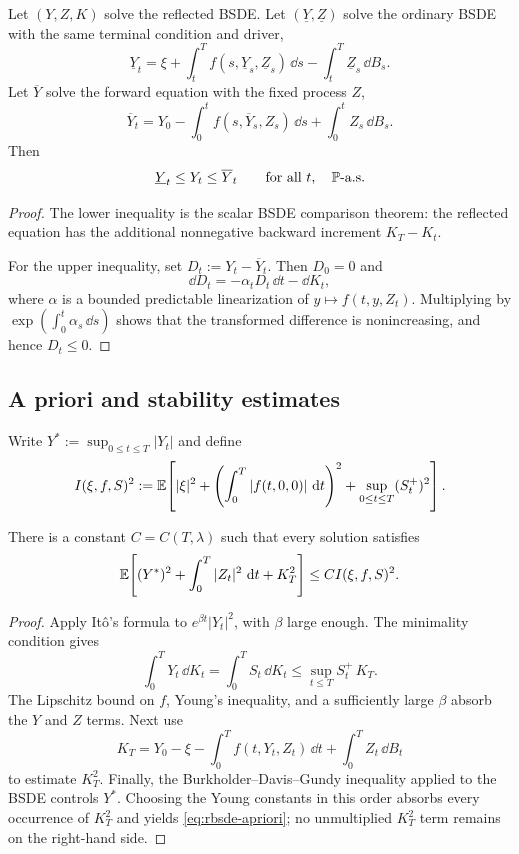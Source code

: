 \begin{proposition}
Let $(Y,Z,K)$ solve the reflected BSDE\@. Let $(\underline Y,\underline Z)$
solve the ordinary BSDE with the same terminal condition and driver,
\[
  \underline Y_t
  =\xi+\int_t^T f(s,\underline Y_s,\underline Z_s)\,\dd s
       -\int_t^T\underline Z_s\,\dd B_s.
\]
Let $\overline Y$ solve the forward equation with the fixed process $Z$,
\[
  \overline Y_t
  =Y_0-\int_0^t f(s,\overline Y_s,Z_s)\,\dd s
       +\int_0^t Z_s\,\dd B_s.
\]
Then
\[
  \underline Y_t\leq Y_t\leq\overline Y_t
  \qquad\text{for all }t,
  \quad\P\text{-a.s.}
\]
\end{proposition}

\begin{proof}
The lower inequality is the scalar BSDE comparison theorem: the reflected
equation has the additional nonnegative backward increment $K_T-K_t$.

For the upper inequality, set $D_t:=Y_t-\overline Y_t$. Then $D_0=0$ and
\[
  \dd D_t=-\alpha_tD_t\,\dd t-\dd K_t,
\]
where $\alpha$ is a bounded predictable linearization of
$y\mapsto f(t,y,Z_t)$. Multiplying by
$\exp(\int_0^t\alpha_s\,\dd s)$ shows that the transformed difference is
nonincreasing, and hence $D_t\leq0$.
\end{proof}

\subsection{A priori and stability estimates}

Write $Y^*:=\sup_{0\leq t\leq T}|Y_t|$ and define
\begin{equation}
  I(\xi,f,S)^2
  :=\E\!\left[
      |\xi|^2
      +\left(\int_0^T|f(t,0,0)|\,\dd t\right)^2
      +\sup_{0\leq t\leq T}(S_t^+)^2
    \right]. \label{eq:rbsde-data-norm}
\end{equation}

\begin{theorem}
There is a constant $C=C(T,\lambda)$ such that every solution satisfies
\begin{equation}
  \E\!\left[
    (Y^*)^2+\int_0^T|Z_t|^2\,\dd t+K_T^2
  \right]
  \leq C I(\xi,f,S)^2. \label{eq:rbsde-apriori}
\end{equation}
\end{theorem}

\begin{proof}
Apply It\^o's formula to $e^{\beta t}|Y_t|^2$, with $\beta$ large enough.
The minimality condition gives
\[
  \int_0^T Y_t\,\dd K_t=\int_0^T S_t\,\dd K_t
  \leq \sup_{t\leq T}S_t^+\,K_T.
\]
The Lipschitz bound on $f$, Young's inequality, and a sufficiently large
$\beta$ absorb the $Y$ and $Z$ terms. Next use
\[
  K_T=Y_0-\xi-\int_0^T f(t,Y_t,Z_t)\,\dd t
      +\int_0^T Z_t\,\dd B_t
\]
to estimate $K_T^2$. Finally, the Burkholder--Davis--Gundy inequality applied
to the BSDE controls $Y^*$. Choosing the Young constants in this order
absorbs every occurrence of $K_T^2$ and yields
\eqref{eq:rbsde-apriori}; no unmultiplied $K_T^2$ term remains on the
right-hand side.
\end{proof}

